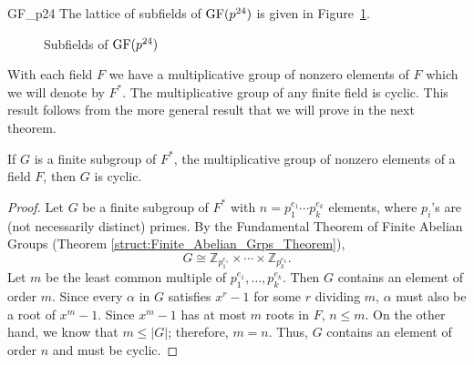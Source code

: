 \begin{example}{GF_p24}
The lattice of subfields of ${\rm GF}(p^{24})$ is given in Figure~\ref{FieldLattice}.

\begin{figure}
\begin{center}
\end{center}
\caption{Subfields of ${\rm GF}(p^{24})$}
\label{FieldLattice}
\end{figure}

\end{example}
 


With each field $F$ we have a multiplicative group of nonzero elements of $F$ which we will denote by $F^*$\label{ntmultgrp}.   The multiplicative group of any finite field is cyclic.  This result follows from the more general result that we will prove in the next theorem. 

\begin{theorem}\label{finite:mult_group_theorem}
If $G$ is a finite  subgroup of $F^\ast$, the multiplicative group of nonzero elements of a field $F$, then $G$ is cyclic. 
\end{theorem}
 

\begin{proof}
Let $G$ be a finite subgroup of $F^\ast$ with $n = p_1^{e_1} \cdots p_k^{e_k}$ elements, where $p_i$'s are (not necessarily distinct) primes. By the Fundamental Theorem of Finite Abelian Groups (Theorem \ref{struct:Finite_Abelian_Grps_Theorem}),  
\[
G \cong {\mathbb Z}_{p_1^{e_1}} \times \cdots \times {\mathbb Z}_{p_k^{e_k}}.
\]
Let $m$ be the least common multiple of $p_1^{e_1}, \ldots, p_k^{e_k}$.  Then $G$ contains an element of order $m$.  Since every $\alpha$ in $G$ satisfies $x^r - 1$ for some $r$ dividing $m$, $\alpha$ must also be a root of $x^m - 1$.  Since $x^m -1$ has at most $m$ roots in $F$, $n \leq m$.  On the other hand, we know that $m \leq |G|$; therefore, $m = n$. Thus, $G$ contains an element of order $n$ and must be cyclic. 
\end{proof}

